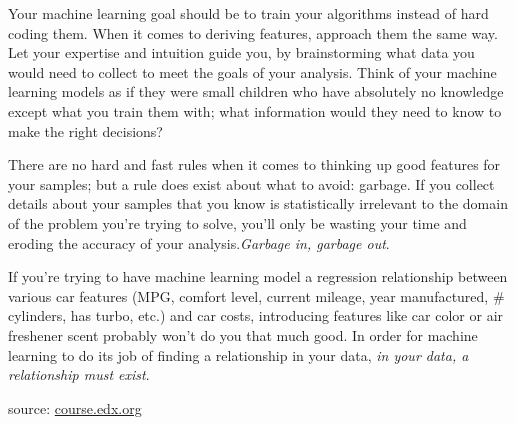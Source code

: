 \documentclass{article}
\begin{document}
\par Your machine learning goal should be to train your algorithms instead of hard coding them. When it comes to deriving features, approach them the same way. Let your expertise and intuition guide you, by brainstorming what data you would need to collect to meet the goals of your analysis. Think of your machine learning models as if they were small children who have absolutely no knowledge except what you train them with; what information would they need to know to make the right decisions?

\par There are no hard and fast rules when it comes to thinking up good features for your samples; but a rule does exist about what to avoid: garbage. If you collect details about your samples that you know is statistically irrelevant to the domain of the problem you're trying to solve, you'll only be wasting your time and eroding the accuracy of your analysis.{\it{Garbage in, garbage out}}.

\par If you're trying to have machine learning model a regression relationship between various car features (MPG, comfort level, current mileage, year manufactured, \# cylinders, has turbo, etc.) and car costs, introducing features like car color or air freshener scent probably won't do you that much good. In order for machine learning to do its job of finding a relationship in your data, {\it{in your data, a relationship must exist}}.

\begin{flushright}
    source: \href{https://courses.edx.org/courses/course-v1:Microsoft+DAT210x+6T2016/courseware/12621a4064aa4d92874a9d8a953734c5/dfc5af6b20e548b4a62b59b73d71d9bd/}{course.edx.org}  
\end{flushright}
\end{document}
